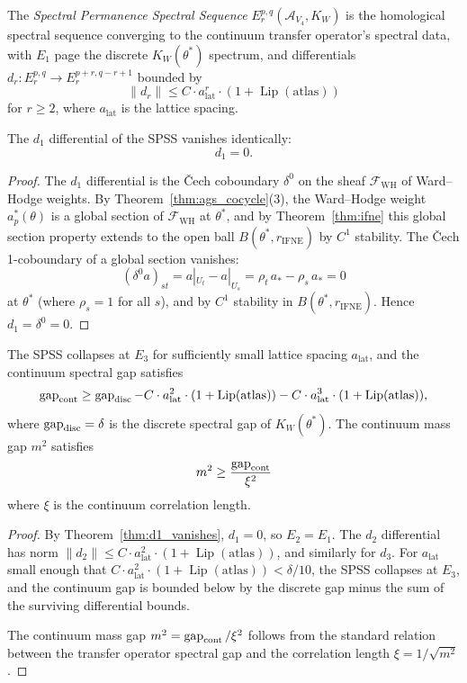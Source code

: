 \begin{definition}[SPSS]
\label{def:spss}
The \emph{Spectral Permanence Spectral Sequence}
$E_{r}^{p,q}(\mathcal{A}_{V_{4}},K_{W})$ is the homological spectral
sequence converging to the continuum transfer operator's spectral data,
with $E_{1}$ page the discrete $K_{W}(\theta^{*})$ spectrum, and
differentials $d_{r}:E_{r}^{p,q}\to E_{r}^{p+r,q-r+1}$ bounded by
\[
\|d_{r}\|\leq C\cdot a_{\mathrm{lat}}^{r}\cdot(1+\operatorname{Lip}(\mathrm{atlas}))
\]
for $r\geq 2$, where $a_{\mathrm{lat}}$ is the lattice spacing.
\end{definition}

\begin{theorem}
\label{thm:d1_vanishes}
The $d_{1}$ differential of the SPSS vanishes identically:
\[
d_{1}=0.
\]
\end{theorem}

\begin{proof}
The $d_{1}$ differential is the \v{C}ech coboundary
$\delta^{0}$ on the sheaf $\mathcal{F}_{\mathrm{WH}}$ of Ward--Hodge
weights. By Theorem~\ref{thm:ags_cocycle}(3), the Ward--Hodge weight
$a_{p}^{*}(\theta)$ is a global section of $\mathcal{F}_{\mathrm{WH}}$
at $\theta^{*}$, and by Theorem~\ref{thm:ifne} this global section
property extends to the open ball $B(\theta^{*},r_{\mathrm{IFNE}})$ by
$C^{1}$ stability. The \v{C}ech 1-coboundary of a global section
vanishes:
\[
(\delta^{0}a)_{st}=a|_{U_{t}}-a|_{U_{s}}=\rho_{t}\,a_{*}-\rho_{s}\,a_{*}=0
\]
at $\theta^{*}$ (where $\rho_{s}=1$ for all $s$), and by $C^{1}$
stability in $B(\theta^{*},r_{\mathrm{IFNE}})$. Hence $d_{1}=\delta^{0}=0$.
\end{proof}

\begin{theorem}
\label{thm:continuum_gap}
The SPSS collapses at $E_{3}$ for sufficiently small lattice spacing
$a_{\mathrm{lat}}$, and the continuum spectral gap satisfies
\[
\operatorname{gap}_{\mathrm{cont}}
\geq \operatorname{gap}_{\mathrm{disc}}-C\cdot a_{\mathrm{lat}}^{2}\cdot(1+\operatorname{Lip}(\mathrm{atlas}))
-C\cdot a_{\mathrm{lat}}^{3}\cdot(1+\operatorname{Lip}(\mathrm{atlas})),
\]
where $\operatorname{gap}_{\mathrm{disc}}=\delta$ is the discrete spectral gap of
$K_{W}(\theta^{*})$. The continuum mass gap $m^{2}$ satisfies
\[
m^{2}\geq \frac{\operatorname{gap}_{\mathrm{cont}}}{\xi^{2}}
\]
where $\xi$ is the continuum correlation length.
\end{theorem}

\begin{proof}
By Theorem~\ref{thm:d1_vanishes}, $d_{1}=0$, so $E_{2}=E_{1}$. The
$d_{2}$ differential has norm
$\|d_{2}\|\leq C\cdot a_{\mathrm{lat}}^{2}\cdot(1+\operatorname{Lip}(\mathrm{atlas}))$,
and similarly for $d_{3}$. For
$a_{\mathrm{lat}}$ small enough that
$C\cdot a_{\mathrm{lat}}^{2}\cdot(1+\operatorname{Lip}(\mathrm{atlas}))<\delta/10$,
the SPSS collapses at $E_{3}$, and the continuum gap is bounded below
by the discrete gap minus the sum of the surviving differential bounds.

The continuum mass gap $m^{2}=\operatorname{gap}_{\mathrm{cont}}/\xi^{2}$ follows
from the standard relation between the transfer operator spectral gap
and the correlation length $\xi=1/\sqrt{m^{2}}$.
\end{proof}

